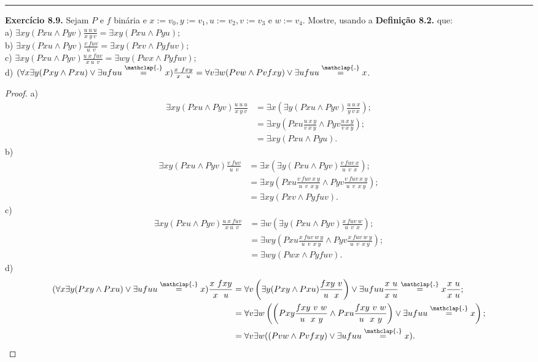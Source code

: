 \documentclass[11pt]{article}
\theoremstyle{definition}
\newcommand\overtext[2]{\stackrel{\mathclap{\normalfont\mbox{#1}}}{#2}}
\begin{document}
\hrule

\textbf{Exercício 8.9.} Sejam $P$ e $f$ binária e $x:=v_0,y:=v_1,u:=v_2,v:=v_3$ e $w:=v_4$. Mostre, usando a \textbf{Definição 8.2.} que:\\
a) $\exists xy(Pxu\wedge Pyv)\frac{u~u~u}{x~y~v}=\exists xy(Pxu\wedge Pyu)$;\\
b) $\exists xy(Pxu\wedge Pyv)\frac{v~fuv}{u~~v}=\exists xy(Pxv\wedge Pyfuv)$;\\
c) $\exists xy(Pxu\wedge Pyv)\frac{u~x~fuv}{x~u~~v}=\exists wy(Pwx\wedge Pyfuv)$;\\
d) $(\forall x\exists y(Pxy\wedge Pxu)\vee\exists ufuu\overtext{.}{=}x)\frac{x~fxy}{x~~u}=\forall v\exists w(Pvw\wedge Pvfxy)\vee\exists ufuu\overtext{.}{=}x$.

\begin{proof}
    a)
    \begin{align*}
        \exists xy(Pxu\wedge Pyv)\frac{u~u~u}{x~y~v} & = \exists x\left(\exists y(Pxu\wedge Pyv)\frac{u~u~x}{y~v~x}\right);\\
        & = \exists xy\left(Pxu\frac{u~x~y}{v~x~y}\wedge Pyv\frac{u~x~y}{v~x~y}\right);\\
        & = \exists xy(Pxu\wedge Pyu).
    \end{align*}
    b)
    \begin{align*}
        \exists xy(Pxu\wedge Pyv)\frac{v~fuv}{u~~v} & = \exists x\left(\exists y(Pxu\wedge Pyv)\frac{v~fuv~x}{u~~v~~x}\right);\\
        & = \exists xy\left(Pxu\frac{v~fuv~x~y}{u~~v~~x~y}\wedge Pyv\frac{v~fuv~x~y}{u~~v~~x~y}\right);\\
        & = \exists xy(Pxv\wedge Pyfuv).
    \end{align*}
    c)
    \begin{align*}
        \exists xy(Pxu\wedge Pyv)\frac{u~x~fuv}{x~u~~v} & = \exists w\left(\exists y(Pxu\wedge Pyv)\frac{x~fuv~w}{u~~v~~x}\right);\\
        & = \exists wy\left(Pxu\frac{x~fuv~w~y}{u~~v~~x~y}\wedge Pyv\frac{x~fuv~w~y}{u~~v~~x~y}\right);\\
        & = \exists wy(Pwx\wedge Pyfuv).
    \end{align*}
    d)
    \begin{align*}
        (\forall x\exists y(Pxy\wedge Pxu)\vee\exists ufuu\overtext{.}{=}x)\frac{x~fxy}{x~~u} & =
        \forall v\left(\exists y(Pxy\wedge Pxu)\frac{fxy~v}{u~~x}\right)\vee\exists ufuu\frac{x~u}{x~u}\overtext{.}{=}x\frac{x~u}{x~u};\\
        & = \forall v\exists w\left(\left(Pxy\frac{fxy~v~w}{u~~x~y}\wedge Pxu\frac{fxy~v~w}{u~~x~y}\right)\vee \exists ufuu\overtext{.}{=}x\right);\\
        & = \forall v\exists w((Pvw\wedge Pvfxy)\vee\exists ufuu\overtext{.}{=}x).
    \end{align*}
\end{proof}
\end{document}
